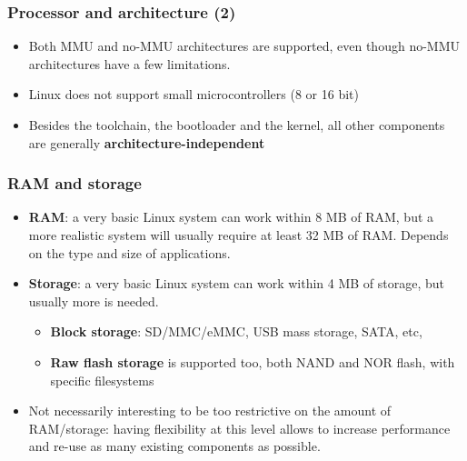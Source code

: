 \begin{frame}
  \frametitle{Processor and architecture (2)}
  \begin{itemize}
  \item Both MMU and no-MMU architectures are supported, even though
    no-MMU architectures have a few limitations.
  \item Linux does not support small microcontrollers (8 or 16 bit)
  \item Besides the toolchain, the bootloader and the kernel, all
    other components are generally {\bf architecture-independent}
  \end{itemize}
\end{frame}

\begin{frame}
  \frametitle{RAM and storage}
  \begin{itemize}
  \item {\bf RAM}: a very basic Linux system can work within 8 MB of
    RAM, but a more realistic system will usually require at least 32
    MB of RAM. Depends on the type and size of applications.
  \item {\bf Storage}: a very basic Linux system can work within 4 MB
    of storage, but usually more is needed.
    \begin{itemize}
    \item {\bf Block storage}: SD/MMC/eMMC, USB mass storage, SATA, etc,
    \item {\bf Raw flash storage} is supported too, both NAND and NOR flash, with
      specific filesystems
    \end{itemize}
  \item Not necessarily interesting to be too restrictive on the
    amount of RAM/storage: having flexibility at this level allows to
    increase performance and re-use as many existing components as possible.
  \end{itemize}
\end{frame}

